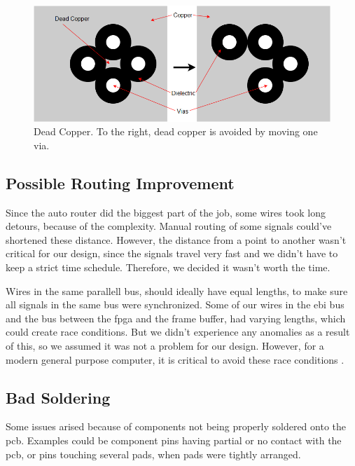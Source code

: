 \begin{figure}[h!]
\centering
\includegraphics[scale = 0.4]{images/Dead_Copper.png}
\caption{Dead Copper. To the right, dead copper is avoided by moving one via.}
\label{fig:Dead copper}
\end{figure}

\subsection{Possible Routing Improvement}
Since the auto router did the biggest part of the job, some wires took long detours, because of the complexity. Manual routing of some signals could've shortened these distance. However, the distance from a point to another wasn't critical for our design, since the signals travel very fast and we didn't have to keep a strict time schedule. Therefore, we decided it wasn't worth the time.

Wires in the same parallell bus, should ideally have equal lengths, to make sure all signals in the same bus were synchronized. Some of our wires in the \gls{ebi} bus and the bus between the \gls{fpga} and the frame buffer, had varying lengths, which could create race conditions. But we didn't experience any anomalies as a result of this, so we assumed it was not a problem for our design. However, for a modern general purpose computer, it is critical to avoid these race conditions \cite{race-conditions}.

\subsection{Bad Soldering}
Some issues arised because of components not being properly soldered onto the \gls{pcb}. Examples could be component pins having partial or no contact with the \gls{pcb}, or pins touching several pads, when pads were tightly arranged.

